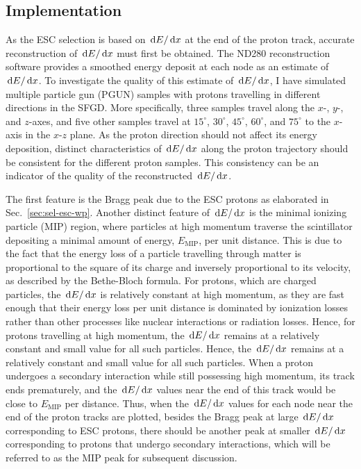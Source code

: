    \subsection{Implementation}
   \label{sec:sel-esc-imp}
	As the ESC selection is based on $\,\textrm{d}E/\,\textrm{d}x$ at the end of the proton track, accurate reconstruction of $\,\textrm{d}E/\,\textrm{d}x$ must first be obtained.
     The ND280 reconstruction software provides a smoothed energy deposit at each node as an estimate of $\,\textrm{d}E/\,\textrm{d}x$.
	To investigate the quality of this estimate of $\,\textrm{d}E/\,\textrm{d}x$, I have simulated multiple particle gun (PGUN) samples with protons travelling in different directions in the SFGD.
	More specifically, three samples travel along the $x$-, $y$-, and $z$-axes, and five other samples travel at $15^\circ$, $30^\circ$, $45^\circ$, $60^\circ$, and $75^\circ$ to the $x$-axis in the $x$-$z$ plane.
	As the proton direction should not affect its energy deposition, distinct characteristics of $\,\textrm{d}E/\,\textrm{d}x$ along the proton trajectory should be consistent for the different proton samples.
     This consistency can be an indicator of the quality of the reconstructed $\,\textrm{d}E/\,\textrm{d}x$.

     The first feature is the Bragg peak due to the ESC protons as elaborated in Sec.~\ref{sec:sel-esc-wp}.
	Another distinct feature of $\,\textrm{d}E/\,\textrm{d}x$ is the minimal ionizing particle (MIP) region, where particles at high momentum traverse the scintillator depositing a minimal amount of energy, $E_{\textrm{MIP}}$, per unit distance.
     This is due to the fact that the energy loss of a particle travelling through matter is proportional to the square of its charge and inversely proportional to its velocity, as described by the Bethe-Bloch formula.
     For protons, which are charged particles, the $\,\textrm{d}E/\,\textrm{d}x$ is relatively constant at high momentum, as they are fast enough that their energy loss per unit distance is dominated by ionization losses rather than other processes like nuclear interactions or radiation losses.
     Hence, for protons travelling at high momentum, the $\,\textrm{d}E/\,\textrm{d}x$ remains at a relatively constant and small value for all such particles.
	Hence, the $\,\textrm{d}E/\,\textrm{d}x$ remains at a relatively constant and small value for all such particles.
     When a proton undergoes a secondary interaction while still possessing high momentum, its track ends prematurely, and the $\,\textrm{d}E/\,\textrm{d}x$ values near the end of this track would be close to $E_{\textrm{MIP}}$ per distance.
	Thus, when the $\,\textrm{d}E/\,\textrm{d}x$ values for each node near the end of the proton tracks are plotted, besides the Bragg peak at large $\,\textrm{d}E/\,\textrm{d}x$ corresponding to ESC protons, there should be another peak at smaller $\,\textrm{d}E/\,\textrm{d}x$ corresponding to protons that undergo secondary interactions, which will be referred to as the MIP peak for subsequent discussion.


